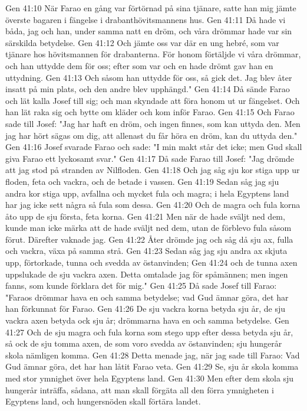 Gen 41:10  När Farao en gång var förtörnad på sina tjänare, satte han mig jämte överste bagaren i fängelse i drabanthövitsmannens hus.
Gen 41:11  Då hade vi båda, jag och han, under samma natt en dröm, och våra drömmar hade var sin särskilda betydelse.
Gen 41:12  Och jämte oss var där en ung hebré, som var tjänare hos hövitsmannen för drabanterna. För honom förtäljde vi våra drömmar, och han uttydde dem för oss; efter som var och en hade drömt gav han en uttydning.
Gen 41:13  Och såsom han uttydde för oss, så gick det. Jag blev åter insatt på min plats, och den andre blev upphängd."
Gen 41:14  Då sände Farao och lät kalla Josef till sig; och man skyndade att föra honom ut ur fängelset. Och han lät raka sig och bytte om kläder och kom inför Farao.
Gen 41:15  Och Farao sade till Josef: "Jag har haft en dröm, och ingen finnes, som kan uttyda den. Men jag har hört sägas om dig, att allenast du får höra en dröm, kan du uttyda den."
Gen 41:16  Josef svarade Farao och sade: "I min makt står det icke; men Gud skall giva Farao ett lyckosamt svar."
Gen 41:17  Då sade Farao till Josef: "Jag drömde att jag stod på stranden av Nilfloden.
Gen 41:18  Och jag såg sju kor stiga upp ur floden, feta och vackra, och de betade i vassen.
Gen 41:19  Sedan såg jag sju andra kor stiga upp, avfallna och mycket fula och magra; i hela Egyptens land har jag icke sett några så fula som dessa.
Gen 41:20  Och de magra och fula korna åto upp de sju första, feta korna.
Gen 41:21  Men när de hade sväljt ned dem, kunde man icke märka att de hade sväljt ned dem, utan de förblevo fula såsom förut. Därefter vaknade jag.
Gen 41:22  Åter drömde jag och såg då sju ax, fulla och vackra, växa på samma strå.
Gen 41:23  Sedan såg jag sju andra ax skjuta upp, förtorkade, tunna och svedda av östanvinden;
Gen 41:24  och de tunna axen uppslukade de sju vackra axen. Detta omtalade jag för spåmännen; men ingen fanns, som kunde förklara det för mig."
Gen 41:25  Då sade Josef till Farao: "Faraos drömmar hava en och samma betydelse; vad Gud ämnar göra, det har han förkunnat för Farao.
Gen 41:26  De sju vackra korna betyda sju år, de sju vackra axen betyda ock sju år; drömmarna hava en och samma betydelse.
Gen 41:27  Och de sju magra och fula korna som stego upp efter dessa betyda sju år, så ock de sju tomma axen, de som voro svedda av östanvinden; sju hungerår skola nämligen komma.
Gen 41:28  Detta menade jag, när jag sade till Farao: Vad Gud ämnar göra, det har han låtit Farao veta.
Gen 41:29  Se, sju år skola komma med stor ymnighet över hela Egyptens land.
Gen 41:30  Men efter dem skola sju hungerår inträffa, sådana, att man skall förgäta all den förra ymnigheten i Egyptens land, och hungersnöden skall förtära landet.
